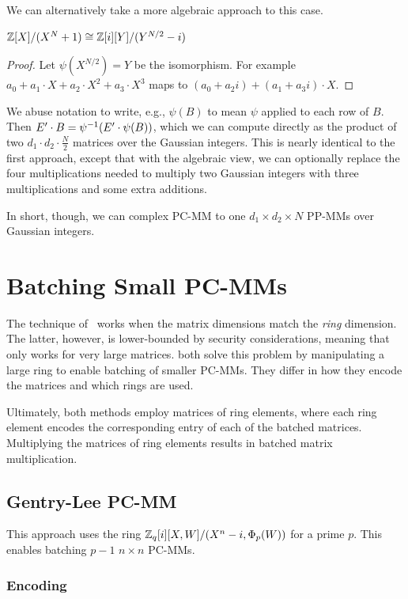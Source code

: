 \documentclass[../fheimpl.tex]{subfiles}
\begin{document}
We can alternatively take a more algebraic approach to this case. 
\begin{lemma}
	$\mathbb{Z}[X]/(X^N+1)\cong \mathbb{Z}[i][Y]/(Y^{N/2}-i)$
\end{lemma}
\begin{proof}
	Let $\psi(X^{N/2})=Y$ be the isomorphism. For example $a_0+a_1\cdot X+a_2\cdot X^2+a_3\cdot X^3$ maps to $(a_0+a_2i) + (a_1+a_3i)\cdot X$.
\end{proof}

We abuse notation to write, e.g., $\psi(B)$ to mean $\psi$ applied to each row of $B$. Then $E'\cdot B = \psi^{-1}\parens*{E'\cdot \psi(B)}$, which we can compute directly as the product of two $d_1\cdot d_2\cdot \frac{N}{2}$ matrices over the Gaussian integers. This is nearly identical to the first approach, except that with the algebraic view, we can optionally replace the four multiplications needed to multiply two Gaussian integers with three multiplications and some extra additions.

In short, though, we can complex PC-MM to one $d_1\times d_2\times N$ PP-MMs over Gaussian integers.

\section{Batching Small PC-MMs}
The technique of~\cite{cryptoeprint:2024/1284} works when the matrix dimensions match the \emph{ring} dimension. The latter, however, is lower-bounded by security considerations, meaning that~\cite{cryptoeprint:2024/1284} only works for very large matrices. \cite{cryptoeprint:2025/1935,cryptoeprint:2025/1957} both solve this problem by manipulating a large ring to enable batching of smaller PC-MMs. They differ in how they encode the matrices and which rings are used.

Ultimately, both methods employ matrices of ring elements, where each ring element encodes the corresponding entry of each of the batched matrices. Multiplying the matrices of ring elements results in batched matrix multiplication.

\subsection{Gentry-Lee PC-MM}
This approach uses the ring $\mathbb{Z}_q[i][X,W]/(X^n-i, \Phi_p(W))$ for a prime $p$. This enables batching $p-1$ $n\times n$ PC-MMs.

\subsubsection{Encoding}
\end{document}
